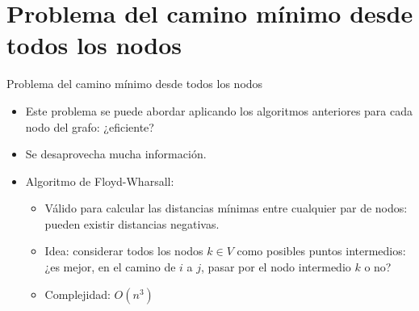 \documentclass[aspectratio=169]{beamer}
\begin{document}
\section{Problema del camino m\'inimo desde todos los nodos}

\begin{frame}{Problema del camino m\'inimo desde todos los nodos}
	\begin{itemize}\itemsep 4mm
		\item Este problema se puede abordar aplicando los algoritmos anteriores para cada nodo del grafo: \alert{¿eficiente?}
		\item Se desaprovecha mucha informaci\'on.
		\item Algoritmo de Floyd-Wharsall:
\begin{itemize}
\item V\'alido para calcular las distancias m\'inimas entre cualquier par de nodos: pueden existir distancias negativas.
\item Idea: considerar todos los nodos $k\in V$ como posibles puntos intermedios: ¿es mejor, en el camino de $i$ a $j$, pasar por el nodo intermedio $k$ o no?
        \item Complejidad: $O(n^3)$
	\end{itemize}
\end{itemize}
\end{frame}
\end{document}
